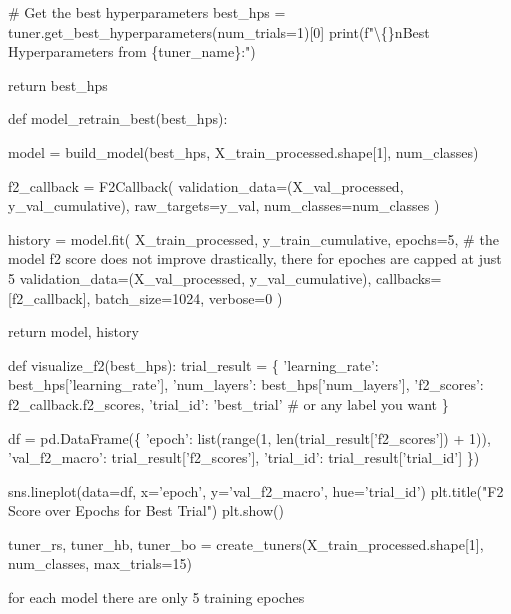 \begin{userprompt}
\# Get the best hyperparameters
    best\_hps = tuner.get\_best\_hyperparameters(num\_trials=1)[0]
    print(f"\textbackslash\{\}nBest Hyperparameters from \{tuner\_name\}:")

return best\_hps

def model\_retrain\_best(best\_hps):

model = build\_model(best\_hps, X\_train\_processed.shape[1], num\_classes)

f2\_callback = F2Callback(
        validation\_data=(X\_val\_processed, y\_val\_cumulative),
        raw\_targets=y\_val,
        num\_classes=num\_classes
    )

history = model.fit(
        X\_train\_processed, y\_train\_cumulative,
        epochs=5, \# the model f2 score does not improve drastically, there for epoches are capped at just 5
        validation\_data=(X\_val\_processed, y\_val\_cumulative),
        callbacks=[f2\_callback],
        batch\_size=1024,
        verbose=0
    )

return model, history

def visualize\_f2(best\_hps):
    trial\_result = \{
    'learning\_rate': best\_hps['learning\_rate'],
    'num\_layers': best\_hps['num\_layers'],
    'f2\_scores': f2\_callback.f2\_scores,
    'trial\_id': 'best\_trial'  \# or any label you want
    \}

df = pd.DataFrame(\{
        'epoch': list(range(1, len(trial\_result['f2\_scores']) + 1)),
        'val\_f2\_macro': trial\_result['f2\_scores'],
        'trial\_id': trial\_result['trial\_id']
    \})

sns.lineplot(data=df, x='epoch', y='val\_f2\_macro', hue='trial\_id')
    plt.title("F2 Score over Epochs for Best Trial")
    plt.show()

tuner\_rs, tuner\_hb, tuner\_bo = create\_tuners(X\_train\_processed.shape[1], num\_classes, max\_trials=15)

for each model there are only 5 training epoches
\end{userprompt}